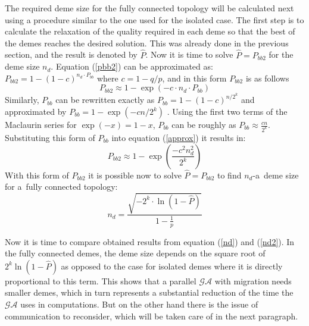 The required deme size for the fully connected topology will be calculated
next using a procedure similar to the one used for the isolated case. The first
step is to calculate the relaxation of the quality required in each deme so that
the best of the demes reaches the desired solution. This was already done in
the previous section, and the result is denoted by $\hat{P}$. Now it is time to
solve  $\hat{P} = P_{bb2}$ for the deme size $n_d$. Equation (\ref{pbb2}) can be 
approximated as: $P_{bb2} = 1 - (1 - c)^{n_d\cdot P_{bb}}$
where $c=1-q/p$, and in this form $P_{bb2}$ is as follows
\begin{equation}
	P_{bb2}\approx 1-\exp(-c\cdot n_d \cdot P_{bb})
	\label{approx}
\end{equation}
Similarly, $P_{bb}$ can be rewritten exactly as $P_{bb}=1-(1-c)^{n/2^k}$ and approximated
by $P_{bb} = 1 - \exp(-cn/2^k)$ . Using the first two terms of the Maclaurin series for
$\exp(-x)=1 - x$, $P_{bb}$ can be roughly as $P_{bb}\approx
\frac{cn}{2^k}$. Substituting this form of $P_{bb}$ into equation (\ref{approx}) it results in:
\begin{equation}
	P_{bb2}\approx 1-\exp(\frac{-c^2n^2_d}{2^k})
	\label{approx2}
\end{equation}
With this form of $P_{bb2}$ it is possible now to solve $\hat{P} = P_{bb2}$ to
find $n_d$-a~deme size for a~fully connected topology:
\begin{equation}
	n_d=\frac{\sqrt{-2^k\cdot\ln(1-\hat{P})}}{1-\frac{1}{p}}
	\label{nd2}
\end{equation}

Now it is time to compare obtained results from equation (\ref{nd}) and
(\ref{nd2}). In the fully connected demes, the deme size depends on 
the square root of $2^k\ln(1-\hat{P})$ as opposed to the
case for isolated demes where it is directly proportional to this
term. This shows that a parallel  $\mathcal{GA}$ with migration needs smaller demes,
which in turn represents a substantial reduction of the time the $\mathcal{GA}$ uses in
computations. But on the other hand there is the issue of communication to
reconsider, which will be taken care of in the next paragraph. 

